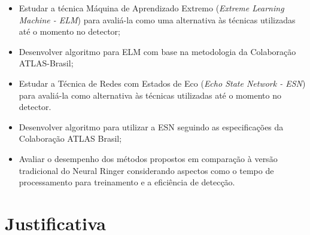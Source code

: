 \begin{itemize}
   \item Estudar a técnica Máquina de Aprendizado Extremo (\textit{Extreme Learning Machine - ELM}) para avaliá-la como uma alternativa às técnicas utilizadas até o momento no detector;
   \item Desenvolver algoritmo para ELM com base na metodologia da Colaboração ATLAS-Brasil;
   \item Estudar a Técnica de Redes com Estados de Eco (\textit{Echo State Network - ESN}) para avaliá-la como alternativa às técnicas utilizadas até o momento no detector.
   \item Desenvolver algoritmo para utilizar a ESN seguindo as especificações da Colaboração ATLAS Brasil;
   \item Avaliar o desempenho dos métodos propostos em comparação à versão tradicional do Neural Ringer considerando aspectos como o tempo de processamento para treinamento e a eficiência de detecção.



\end{itemize}


\section{Justificativa}

